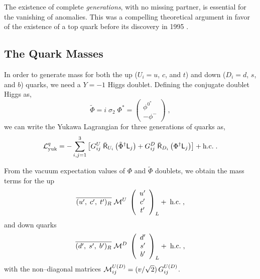 \documentclass[12pt]{report}
\def\text#1{{\scriptstyle\mathrm{#1}}}
\newcommand{\ld}{\mbox{\sf L}}
\newcommand{\rs}{\mbox{\sf R}}
\newcommand{\lag}{{\cal L}}
\newcommand{\ba}{\begin{array}}
\newcommand{\ea}{\end{array}}
\begin{document}
The existence of complete {\it generations}, with no missing
partner,  is essential for the vanishing of anomalies. This was a
compelling  theoretical argument in favor of the existence of a top
quark before its discovery in 1995 \cite{Abe:95,Abachi:95}.



\subsection{The Quark Masses} \indent

In order to generate mass for both the up ($U_i = u$, $c$, and $t$)
and down  ($D_i = d$, $s$, and $b$) quarks, we need a $Y = -1$ Higgs
doublet. Defining the conjugate doublet Higgs as,
\begin{equation}
\tilde{\Phi} = i \; \sigma_2 \; \Phi^* = \left( \ba{c}
	      		\phi^{0^*} \\
	      	 	- \phi^-
              \ea \right) \; ,
\label{conj:hig}
\end{equation}
we can write the Yukawa Lagrangian for three generations of quarks
as, 
\begin{equation}
\lag_{\text{yuk}}^q = - \sum_{i,j = 1}^3 
\left[ G^U_{ij} \; \bar{\rs}_{U_i} \left( \tilde{\Phi}^\dagger \ld_j \right) +
G^D_{ij}\;  \bar{\rs}_{D_i} \left( \Phi^\dagger \ld_j \right) \right] +
\mbox{h.c.} \; .
\label{yuk:qua}
\end{equation}

From the vacuum expectation values of $\Phi$ and $\tilde{\Phi}$
doublets, we obtain the mass terms for the up
\[
\overline{(u^\prime, \; c^\prime, \; t^\prime)_R} \; {\cal M}^U \; \left( \ba{c}
	      						u^\prime\\
	      	 					c^\prime\\
							t^\prime
             					 \ea \right)_L +
\; \mbox{h.c.} \; ,
\]
and down quarks
\[
\overline{(d^\prime, \; s^\prime, \; b^\prime)_R} \; {\cal M}^D \; \left( \ba{c}
	      						d^\prime\\
	      	 					s^\prime\\
							b^\prime
             					 \ea \right)_L +
\; \mbox{h.c.} \; ,
\]
with the non--diagonal matrices ${\cal M}^{U(D)}_{ij} = (v/\sqrt{2})
\, G^{U(D)}_{ij}$.
\end{document}
